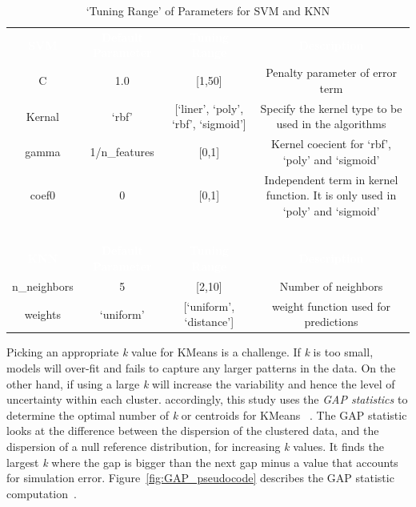 \documentclass[sigconf]{acmart}
\theoremstyle{break}
\begin{document}
     \begin{table}[!t]
    \small
        \centering
       \begin{tabular}{c|c|c|c}
         \rowcolor{darkgray} \textcolor{white}{\textbf{SVM}} & \textcolor{white}{\textbf{Default Parameter}}  & \textcolor{white}{\textbf{Tuning Range }} & \textcolor{white}{\textbf{Description}} \\
            C & 1.0 & [1,50] & Penalty parameter of  error term \\ 
            \rowcolor{lightgray} Kernal & `rbf' & [`liner', `poly', `rbf', `sigmoid'] & Specify the kernel type to be used in the algorithms \\ 
            gamma & 1/n\_features & [0,1] & Kernel coecient for `rbf', `poly' and `sigmoid' \\ 
             \rowcolor{lightgray}coef0 & 0 & [0,1] & Independent term in kernel function. It is only used in `poly' and `sigmoid' \\
            \multicolumn{1}{c}{~}\\
            \rowcolor{darkgray} \textcolor{white}{\textbf{KNN}} & \textcolor{white}{\textbf{Default Parameter}} & \textcolor{white}{\textbf{Tuning Range }} & \textcolor{white}{\textbf{Description}} \\ 
            n\_neighbors & 5 & [2,10] & Number of neighbors \\ 
            \rowcolor{lightgray} weights & `uniform' & [`uniform', `distance'] & weight function used for predictions 
        \end{tabular}    
        \caption{`Tuning Range' of Parameters for SVM and KNN}
        \label{tab:DE_Parameters}
    \end{table}
    
    Picking an appropriate {\em k} value for KMeans is a challenge. If {\em k} is too small,  models will over-fit and  fails to capture any larger patterns in the data. On the other hand, if using a large {\em k} will increase the variability and hence the level of uncertainty within each cluster. accordingly, this study uses the {\em GAP statistics} to determine the optimal number of {\em k} or centroids for KMeans ~\cite{mohajer2011comparison,tibshirani2001estimating}. The GAP statistic looks at the difference between the dispersion of the clustered data, and the dispersion of a null reference distribution, for increasing {\em k} values. It finds the largest {\em k} where the gap is bigger than the next gap minus a value that accounts for simulation error.   Figure~\ref{fig:GAP_pseudocode} describes the GAP statistic
    computation~\cite{tibshirani2001estimating}.
    
\end{document}
